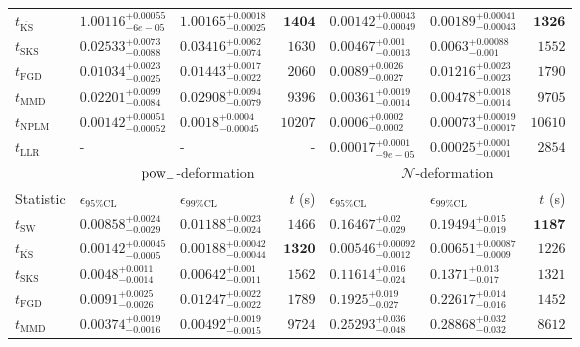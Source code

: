 \begin{tabular}{l|llr|llr}
	$t_{\overline{\mathrm{KS}}}$ & $1.00116_{-6e-05}^{+0.00055}$ & $1.00165_{-0.00025}^{+0.00018}$ & ${\mathbf{1404}}$ & ${\mathbf{0.00142_{-0.00049}^{+0.00043}}}$ & ${\mathbf{0.00189_{-0.00043}^{+0.00041}}}$ & ${\mathbf{1326}}$ \\
	$t_{\mathrm{SKS}}$ & $0.02533_{-0.0088}^{+0.0073}$ & $0.03416_{-0.0074}^{+0.0062}$ & $1630$ & $0.00467_{-0.0013}^{+0.001}$ & $0.0063_{-0.001}^{+0.00088}$ & $1552$ \\
	$t_{\mathrm{FGD}}$ & ${\mathbf{0.01034_{-0.0025}^{+0.0023}}}$ & ${\mathbf{0.01443_{-0.0022}^{+0.0017}}}$ & $2060$ & $0.0089_{-0.0027}^{+0.0026}$ & $0.01216_{-0.0023}^{+0.0023}$ & $1790$ \\
	$t_{\mathrm{MMD}}$ & $0.02201_{-0.0084}^{+0.0099}$ & $0.02908_{-0.0079}^{+0.0094}$ & $9396$ & $0.00361_{-0.0014}^{+0.0019}$ & $0.00478_{-0.0014}^{+0.0018}$ & $9705$ \\
\rowcolor{red!35}	$t_{\mathrm{NPLM}}$ & $0.00142_{-0.00052}^{+0.00051}$ & $0.0018_{-0.00045}^{+0.0004}$ & $10207$ & $0.0006_{-0.0002}^{+0.0002}$ & $0.00073_{-0.00017}^{+0.00019}$ & $10610$ \\
	$t_{\mathrm{LLR}}$ & - & - & - & $0.00017_{-9e-05}^{+0.0001}$ & $0.00025_{-0.0001}^{+0.0001}$ & $2854$ \\
	\toprule
	\multicolumn{1}{c}{} & \multicolumn{3}{c}{$\rm{pow}_{-}$-deformation} & \multicolumn{3}{c}{$\mathcal{N}$-deformation} \\
	Statistic & $\epsilon_{95\%\mathrm{CL}}$ & $\epsilon_{99\%\mathrm{CL}}$ & $t$ (s) & $\epsilon_{95\%\mathrm{CL}}$ & $\epsilon_{99\%\mathrm{CL}}$ & $t$ (s) \\
	\midrule
	$t_{\mathrm{SW}}$ & $0.00858_{-0.0029}^{+0.0024}$ & $0.01188_{-0.0024}^{+0.0023}$ & $1466$ & $0.16467_{-0.029}^{+0.02}$ & $0.19494_{-0.019}^{+0.015}$ & ${\mathbf{1187}}$ \\
	$t_{\overline{\mathrm{KS}}}$ & ${\mathbf{0.00142_{-0.0005}^{+0.00045}}}$ & ${\mathbf{0.00188_{-0.00044}^{+0.00042}}}$ & ${\mathbf{1320}}$ & ${\mathbf{0.00546_{-0.0012}^{+0.00092}}}$ & ${\mathbf{0.00651_{-0.0009}^{+0.00087}}}$ & $1226$ \\
	$t_{\mathrm{SKS}}$ & $0.0048_{-0.0014}^{+0.0011}$ & $0.00642_{-0.0011}^{+0.001}$ & $1562$ & $0.11614_{-0.024}^{+0.016}$ & $0.1371_{-0.017}^{+0.013}$ & $1321$ \\
	$t_{\mathrm{FGD}}$ & $0.0091_{-0.0026}^{+0.0025}$ & $0.01247_{-0.0022}^{+0.0022}$ & $1789$ & $0.1925_{-0.027}^{+0.019}$ & $0.22617_{-0.016}^{+0.014}$ & $1452$ \\
	$t_{\mathrm{MMD}}$ & $0.00374_{-0.0016}^{+0.0019}$ & $0.00492_{-0.0015}^{+0.0019}$ & $9724$ & $0.25293_{-0.048}^{+0.036}$ & $0.28868_{-0.032}^{+0.032}$ & $8612$ \\

\end{tabular}
